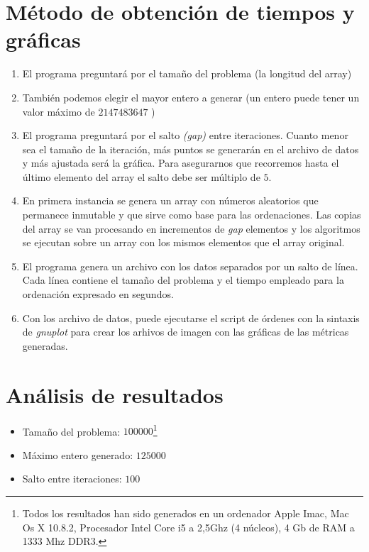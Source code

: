 \section{Método de obtención de tiempos y gráficas}
	\begin{enumerate}
		\item El programa preguntará por el tamaño del problema (la longitud del array)
		\item También podemos elegir el mayor entero a generar (un entero puede tener un valor 				máximo de $2147483647$ )
		\item El programa preguntará por el salto \emph{(gap)} entre iteraciones.  Cuanto menor sea el tamaño de la iteración, más puntos se generarán en el archivo de datos y más ajustada será la gráfica.  Para asegurarnos que 					recorremos hasta el último elemento del array el salto debe ser múltiplo de $5$.
		\item En primera instancia se genera un array con números aleatorios que permanece inmutable y que sirve como base 					para las ordenaciones. Las copias del array se van procesando en incrementos de \textit{gap} elementos y los algoritmos se ejecutan sobre un array con los mismos elementos que el array original.
		\item El programa genera un archivo con los datos separados por un salto de línea.  Cada 					línea contiene el tamaño del problema y el tiempo empleado para la ordenación expresado 			en segundos.
		\item Con los archivo de datos, puede ejecutarse el script de órdenes con la sintaxis de 				\textit{gnuplot} para crear los arhivos de imagen con las gráficas de las métricas 					generadas.
	\end{enumerate}


\section{Análisis de resultados}
\begin{itemize}
\item Tamaño del problema: $100000$\footnote{Todos los resultados han sido generados en un ordenador Apple Imac, Mac Os X 10.8.2, Procesador Intel Core i5 a 2,5Ghz (4 núcleos), 4 Gb de RAM a 1333 Mhz DDR3.}
\item Máximo entero generado: $125000$
\item Salto entre iteraciones: $100$
\end{itemize}
\newpage
